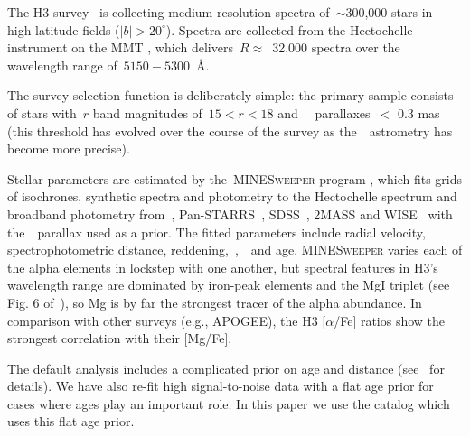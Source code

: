 \documentclass[foo.tex]{subfiles}
\begin{document}
The H3 survey~\citep{Conroy2019} is collecting medium-resolution spectra
of~$\sim$300,000 stars in high-latitude fields ($\left|b\right| > 20^\circ$).
Spectra are collected from the Hectochelle instrument on the MMT
\citep{Szentgyorgyi2011}, which delivers~$R \approx$~32,000 spectra over the
wavelength range of~$5150 - 5300$~\AA.
{\color{red}
The survey selection function is deliberately simple: the primary sample
consists of stars with~$r$ band magnitudes of~$15 < r < 18$
and~\gaia~\citep{Gaia2016} parallaxes~$<$ 0.3 mas (this threshold has evolved
over the course of the survey as the~\gaia~astrometry has become more precise).
\par
Stellar parameters are estimated by the~\textsc{MINESweeper} program
\citep{Cargile2020}, which fits grids of isochrones, synthetic spectra and
photometry to the Hectochelle spectrum and broadband photometry from~\gaia,
Pan-STARRS~\citep{Chambers2016}, SDSS~\citep{York2000}, 2MASS
\citep{Skrutskie2006} and WISE~\citep{Wright2010} with the~\gaia~parallax
used as a prior.
The fitted parameters include radial velocity, spectrophotometric distance,
reddening,~\feh,~\afe~and age.
\textsc{MINESweeper} varies each of the alpha elements in lockstep with one
another, but spectral features in H3's wavelength range are dominated by
iron-peak elements and the MgI triplet (see Fig. 6 of~\citealp{Conroy2019}), so
Mg is by far the strongest tracer of the alpha abundance.
In comparison with other surveys (e.g., APOGEE), the H3 [$\alpha$/Fe] ratios
show the strongest correlation with their [Mg/Fe].
}
The default analysis includes a complicated prior on age and distance
(see~\citealt{Cargile2020} for details).
We have also re-fit high signal-to-noise data with a flat age prior for cases
where ages play an important role.
In this paper we use the catalog which uses this flat age prior.
\end{document}
